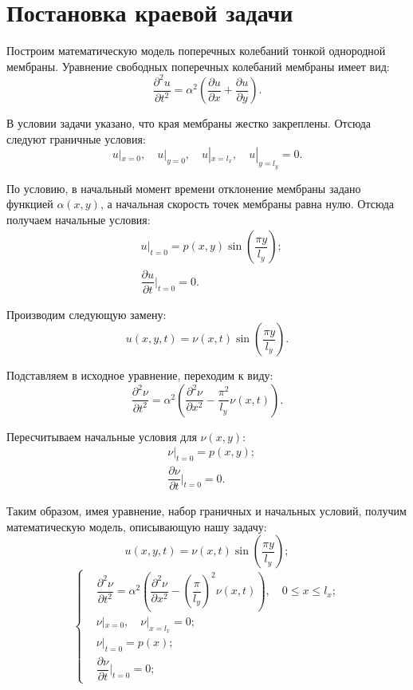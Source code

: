 \section{Постановка краевой задачи}
{
	Построим математическую модель поперечных колебаний тонкой однородной мембраны.
	Уравнение свободных поперечных колебаний мембраны имеет вид:
	\begin{equation}\label{source_func}
	\dfrac{\partial^2 u}{\partial t^2} = \alpha^2(
	\dfrac{\partial u}{\partial x} + 
	\dfrac{\partial u}{\partial y}).
	\end{equation}
	
	В условии задачи указано, что края мембраны жестко закреплены. Отсюда
	следуют граничные условия:
	\begin{equation}
	u|_{x=0}, \quad
	u|_{y=0},  \quad
	u|_{x=l_x}, \quad
	u|_{y=l_y} = 0.
	\end{equation}
	
	По условию, в начальный момент времени отклонение мембраны задано функцией $\alpha(x, y)$, а начальная скорость точек мембраны равна нулю. Отсюда получаем начальные условия:
	\begin{align*}
	&  u|_{t=0} = p(x,y)\sin(\dfrac{\pi y}{l_y});\\        
	& \dfrac{\partial u}{\partial t}|_{t=0} = 0.
	\end{align*}
	
	Производим следующую замену:
	\begin{equation}\label{change}
	u(x,y,t) = \nu(x,t)\sin (\dfrac{\pi y}{l_y}).
	\end{equation}    
	
	Подставляем в исходное уравнение, переходим к виду:
	\begin{equation}
	\dfrac{\partial^2 \nu}{\partial t^2} = \alpha^2(\dfrac{\partial^2 \nu}{\partial x^2}
	- \dfrac{\pi^2}{l_y}\nu(x, t)).
	\end{equation}
	
	Пересчитываем начальные условия для $\nu(x,y)$:
	\begin{align*}
	&  \nu|_{t=0} = p(x,y);\\        
	& \dfrac{\partial \nu}{\partial t}|_{t=0} = 0.
	\end{align*}
	
	
	Таким образом, имея уравнение, набор граничных и начальных условий, получим математическую модель, описывающую нашу задачу:
	\begin{equation}
	u(x,y,t) = \nu(x,t)\sin (\dfrac{\pi y}{l_y});
	\end{equation}
	\begin{equation}\label{full_initial_problem}
	\left\{
	\begin{split}
	& \dfrac{\partial^2 \nu}{\partial t^2} = \alpha^2\left(\dfrac{\partial^2 \nu}{\partial x^2}
	- \left(\dfrac{\pi}{l_y}\right)^2\nu(x, t)\right), {\quad 0 \le x \le l_x;} \\
	&\nu|_{x=0}, \quad  
	\nu|_{x=l_x} = 0;\\
	&  \nu|_{t=0} = p(x);\\        
	& \dfrac{\partial \nu}{\partial t}|_{t=0} = 0;
	\end{split}
	\right.
	\end{equation}
}


